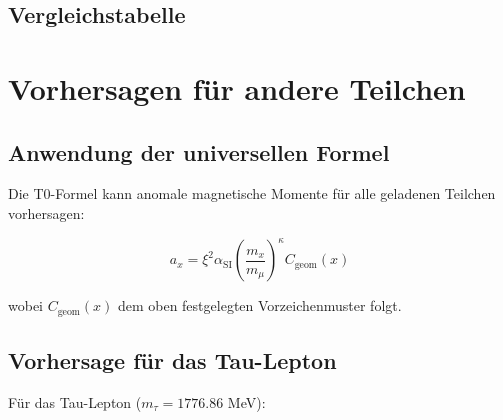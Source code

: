 \documentclass[12pt,a4paper]{article}
\newcommand{\xipar}{\xi}
\newcommand{\alphaSI}{\alpha_{\text{SI}}}
\newcommand{\Cgeom}{C_{\text{geom}}}
\newcommand{\kappaT}{\kappa}
\newcommand{\mmu}{m_{\mu}}
\begin{document}
	\subsection{Vergleichstabelle}
	
\begin{table}[H]
	\centering
	\caption{Vorhersagen der T0-Theorie im Vergleich zu experimentellen Ergebnissen}
\end{table}
	
	\section{Vorhersagen für andere Teilchen}
	
	\subsection{Anwendung der universellen Formel}
	
	Die T0-Formel kann anomale magnetische Momente für alle geladenen Teilchen vorhersagen:
	
	\begin{equation}
		a_x = \xipar^2 \alphaSI \left(\frac{m_x}{\mmu}\right)^{\kappaT} \Cgeom(x)
	\end{equation}
	
	wobei $\Cgeom(x)$ dem oben festgelegten Vorzeichenmuster folgt.
	
	\subsection{Vorhersage für das Tau-Lepton}
	
	Für das Tau-Lepton ($m_\tau = 1776.86$ MeV):
	
\end{document}
